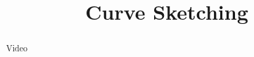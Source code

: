\documentclass[handout]{ximera}
\title{Curve Sketching}
\begin{document}
\begin{abstract} Video %
\end{abstract}

\maketitle

\end{document}
